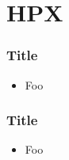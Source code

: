 \documentclass[compress]{beamer}
\begin{document}
\section{HPX}
\begin{frame}
	\frametitle{Title}
	\begin{itemize}
		\item Foo
	\end{itemize}
\end{frame}

\begin{frame}
	\frametitle{Title}
	\begin{itemize}
		\item Foo
	\end{itemize}
\end{frame}



\end{document}
